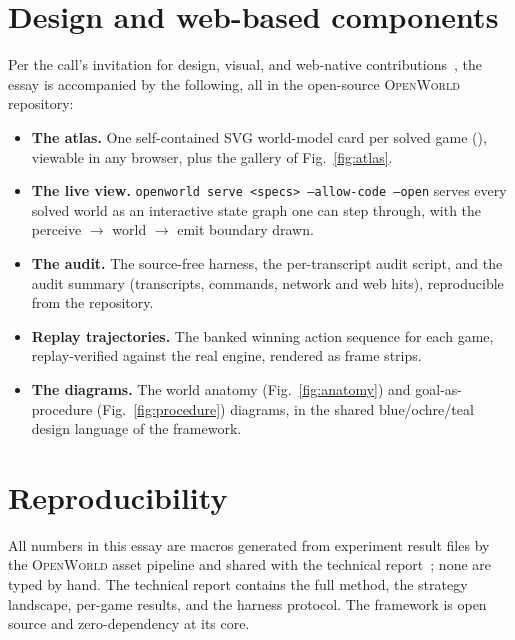 \documentclass[11pt]{article}
\newcommand{\openworld}{\textsc{OpenWorld}}
\begin{document}
\section*{Design and web-based components}
\label{sec:components}

Per the call's invitation for design, visual, and web-native contributions~\cite{agentworld_cfp}, the
essay is accompanied by the following, all in the open-source \openworld{} repository:

\begin{itemize}\setlength{\itemsep}{2pt}
\item \textbf{The atlas.} One self-contained SVG world-model card per solved game
(), viewable in any browser, plus the gallery of Fig.~\ref{fig:atlas}.
\item \textbf{The live view.} \texttt{openworld serve <specs> --allow-code --open} serves every solved
world as an interactive state graph one can step through, with the perceive $\to$ world $\to$ emit
boundary drawn.
\item \textbf{The audit.} The source-free harness, the per-transcript audit script, and the audit summary
(transcripts, commands, network and web hits), reproducible from the repository.
\item \textbf{Replay trajectories.} The banked winning action sequence for each game, replay-verified
against the real engine, rendered as frame strips.
\item \textbf{The diagrams.} The world anatomy (Fig.~\ref{fig:anatomy}) and goal-as-procedure
(Fig.~\ref{fig:procedure}) diagrams, in the shared blue/ochre/teal design language of the framework.
\end{itemize}

\section*{Reproducibility}
All numbers in this essay are macros generated from experiment result files by the \openworld{} asset
pipeline and shared with the technical report~\cite{openworld_arc3}; none are typed by hand. The
technical report contains the full method, the strategy landscape, per-game results, and the harness
protocol. The framework is open source and zero-dependency at its core.



\end{document}
